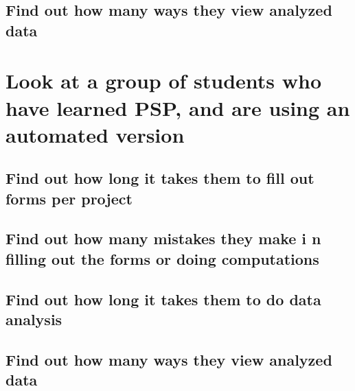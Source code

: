 \subsection{Find out how many ways they view analyzed data}
\section{Look at a group of students who have learned PSP, and are using an automated version}
\subsection{Find out how long it takes them to fill out forms per project}
\subsection{Find out how many mistakes they make i
n filling out the forms or doing computations}
\subsection{Find out how long it takes them to do data analysis}
\subsection{Find out how many ways they view analyzed data}

